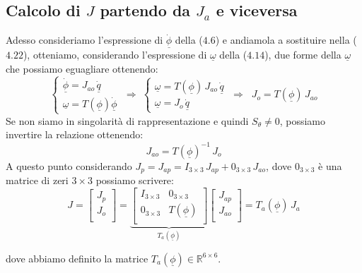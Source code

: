 \subsection{Calcolo di $J$ partendo da $J_a$ e viceversa}
Adesso consideriamo l'espressione di $\underline{\dot{\phi}}$ della ($4.6$) e andiamola a sostituire nella ($4.22$), otteniamo, considerando l'espressione di $\underline{\omega}$ della ($4.14$), due forme della $\underline{\omega}$ che possiamo eguagliare ottenendo:
\begin{equation}
	\begin{cases}
		\underline{\dot{\phi}} = J_{ao}\,\underline{\dot{q}} \\
		\underline{\omega} = T(\underline{\phi})\underline{\dot{\phi}}
	\end{cases}
	\;\Rightarrow\; 
	\begin{cases}
		\underline{\omega} = T(\underline{\phi})\,J_{ao}\,\underline{\dot{q}}\\
		\underline{\omega} = J_o \, \underline{\dot{q}} 
	\end{cases}
	\;\Rightarrow\;\;
	J_o = T(\underline{\phi})\,J_{ao}
\end{equation}
Se non siamo in singolarità di rappresentazione e quindi $S_{\theta} \neq 0$, possiamo invertire la relazione ottenendo:
\begin{equation}
	J_{ao} = T(\underline{\phi})^{-1}\,J_o
\end{equation}
A questo punto considerando $J_p = J_{ap} = I_{3 \times 3}\,J_{ap} + 0_{3 \times 3}\,J_{ao}$, dove $0_{3 \times 3}$ è una matrice di zeri $3 \times 3$ possiamo scrivere:
\begin{equation}
	J = 
	\begin{bmatrix}
	J_p \\
	J_o \\
	\end{bmatrix}
	=
	\underbrace{ 
	\begin{bmatrix}
		I_{3 \times 3} & 0_{3 \times 3} \\
		0_{3 \times 3} & T(\underline{\phi}) \\
	\end{bmatrix}
	}_{T_a(\underline{\phi})}
	\begin{bmatrix}
		J_{ap} \\
		J_{ao} \\
	\end{bmatrix}
	= 
	T_a(\underline{\phi})\,J_a
\end{equation}

dove abbiamo definito la matrice $T_a(\underline{\phi})\in\mathbb{R}^{6 \times 6}$. 
